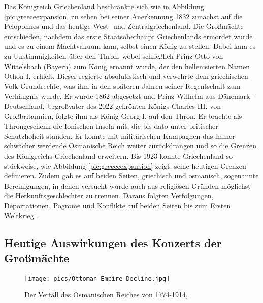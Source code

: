 \documentclass[preprint]{geomorphica} %
\begin{document}
Das Königreich Griechenland beschränkte sich wie in Abbildung \ref{pic:greeceexpansion} zu sehen bei seiner Anerkennung 1832 zunächst auf die Peloponnes und das heutige West- und Zentralgriechenland.
Die Großmächte entschieden, nachdem das erste Staatsoberhaupt Griechenlands ermordet wurde und es zu einem Machtvakuum kam, selbst einen König zu stellen.
Dabei kam es zu Unstimmigkeiten über den Thron, wobei schließlich Prinz Otto von Wittelsbach (Bayern) zum König ernannt wurde, der den hellenisierten Namen Othon I. erhielt.
Dieser regierte absolutistisch und verwehrte dem griechischen Volk Grundrechte, was ihm in den späteren Jahren seiner Regentschaft zum Verhängnis wurde.
Er wurde 1862 abgesetzt und Prinz Wilhelm aus Dänemark-Deutschland, Urgroßvater des 2022 gekrönten Königs Charles III. von Großbritannien, folgte ihm als König Georg I. auf den Thron.
Er brachte als Throngeschenk die Ionischen Inseln mit, die bis dato unter britischer Schutzhoheit standen.
Er konnte mit militärischen Kampagnen das immer schwächer werdende Osmanische Reich weiter zurückdrängen und so die Grenzen des Königreichs Griechenland erweitern.
Bis 1923 konnte Griechenland so stückweise, wie Abbildung \ref{pic:greeceexpansion} zeigt, seine heutigen Grenzen definieren.
Zudem gab es auf beiden Seiten, griechisch und osmanisch, sogenannte Bereinigungen, in denen versucht wurde auch aus religiösen Gründen möglichst die Herkunftsgeschlechter zu trennen.
Daraus folgten Verfolgungen, Deportationen, Pogrome und Konflikte auf beiden Seiten bis zum Ersten Weltkrieg \cite{Brewer2001, Dakin1952, Clair2008, Forster1958, Woodhouse1965}.

\subsection{Heutige Auswirkungen des Konzerts der Großmächte}

\begin{figure}[h]
    \centering
    \texttt{[image: pics/Ottoman Empire Decline.jpg]}
    \caption{Der Verfall des Osmanischen Reiches von 1774-1914, \cite{KappaXX}}
    \label{pic:ottomandecline}
\end{figure}
\end{document}
